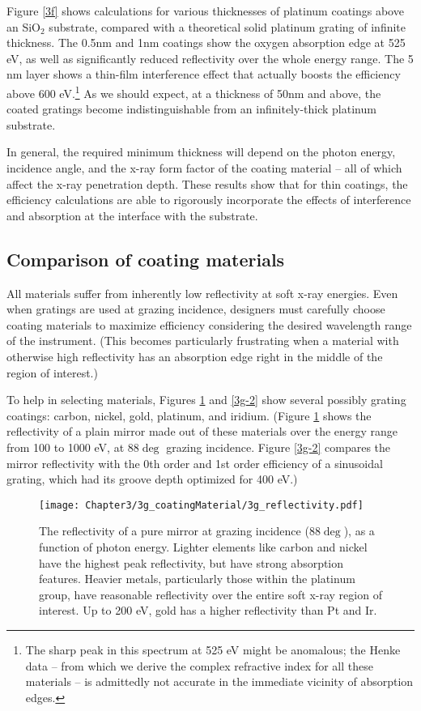 Figure \ref{3f} shows calculations for various thicknesses of platinum coatings above an SiO$_2$ substrate, compared with a theoretical solid platinum grating of infinite thickness.  The 0.5nm and 1nm coatings show the oxygen absorption edge at 525 eV, as well as significantly reduced reflectivity over the whole energy range.  The 5 nm layer shows a thin-film interference effect that actually boosts the efficiency above 600 eV.\footnote{The sharp peak in this spectrum at 525 eV might be anomalous; the Henke data -- from which we derive the complex refractive index for all these materials -- is admittedly not accurate in the immediate vicinity of absorption edges.}  As we should expect, at a thickness of 50nm and above, the coated gratings become indistinguishable from an infinitely-thick platinum substrate.  

In general, the required minimum thickness will depend on the photon energy, incidence angle, and the x-ray form factor of the coating material -- all of which affect the x-ray penetration depth.  These results show that for thin coatings, the efficiency calculations are able to rigorously incorporate the effects of interference and absorption at the interface with the substrate.

\subsection{Comparison of coating materials}
All materials suffer from inherently low reflectivity at soft x-ray energies.  Even when gratings are used at grazing incidence, designers must carefully choose coating materials to maximize efficiency considering the desired wavelength range of the instrument.  (This becomes particularly frustrating when a material with otherwise high reflectivity has an absorption edge right in the middle of the region of interest.)

To help in selecting materials, Figures \ref{3g} and \ref{3g-2} show several possibly grating coatings: carbon, nickel, gold, platinum, and iridium.  (Figure \ref{3g} shows the reflectivity of a plain mirror made out of these materials over the energy range from 100 to  1000 eV, at 88$\deg$ grazing incidence.  Figure \ref{3g-2} compares the mirror reflectivity with the 0th order and 1st order efficiency of a sinusoidal grating, which had its groove depth optimized for 400 eV.)

\begin{figure}[htbp] %
   \centering
   \texttt{[image: Chapter3/3g\_coatingMaterial/3g\_reflectivity.pdf]} 
   \caption{The reflectivity of a pure mirror at grazing incidence (88$\deg$), as a function of photon energy.  Lighter elements like carbon and nickel have the highest peak reflectivity, but have strong absorption features.  Heavier metals, particularly those within the platinum group, have reasonable reflectivity over the entire soft x-ray region of interest.  Up to 200 eV, gold has a higher reflectivity than Pt and Ir. }
   \label{3g}
\end{figure}

